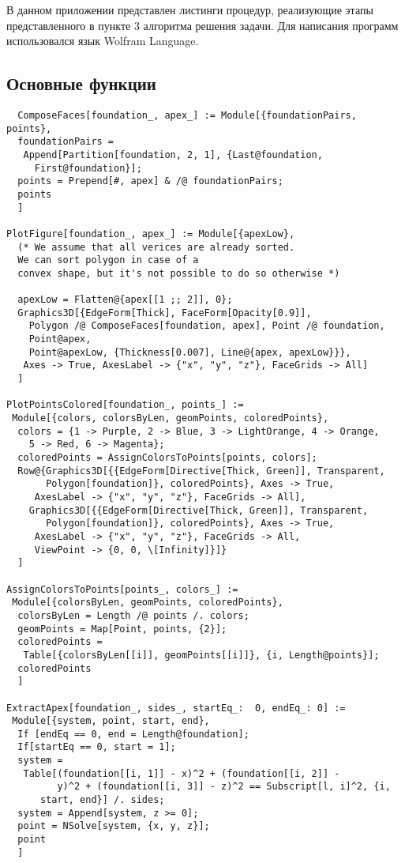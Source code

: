 \documentclass[../main.tex]{subfiles}
\begin{document}
В данном приложении представлен листинги процедур, реализующие этапы представленного в пункте 3 алгоритма решения задачи. Для написания программ использовался язык {\ttfamily Wolfram Language}.

\subsection{Основные функции}
\begin{lstlisting}
  ComposeFaces[foundation_, apex_] := Module[{foundationPairs, points},
  foundationPairs =
   Append[Partition[foundation, 2, 1], {Last@foundation,
     First@foundation}];
  points = Prepend[#, apex] & /@ foundationPairs;
  points
  ]

PlotFigure[foundation_, apex_] := Module[{apexLow},
  (* We assume that all verices are already sorted.
  We can sort polygon in case of a
  convex shape, but it's not possible to do so otherwise *)

  apexLow = Flatten@{apex[[1 ;; 2]], 0};
  Graphics3D[{EdgeForm[Thick], FaceForm[Opacity[0.9]],
    Polygon /@ ComposeFaces[foundation, apex], Point /@ foundation,
    Point@apex,
    Point@apexLow, {Thickness[0.007], Line@{apex, apexLow}}},
   Axes -> True, AxesLabel -> {"x", "y", "z"}, FaceGrids -> All]
  ]

PlotPointsColored[foundation_, points_] :=
 Module[{colors, colorsByLen, geomPoints, coloredPoints},
  colors = {1 -> Purple, 2 -> Blue, 3 -> LightOrange, 4 -> Orange,
    5 -> Red, 6 -> Magenta};
  coloredPoints = AssignColorsToPoints[points, colors];
  Row@{Graphics3D[{{EdgeForm[Directive[Thick, Green]], Transparent,
       Polygon[foundation]}, coloredPoints}, Axes -> True,
     AxesLabel -> {"x", "y", "z"}, FaceGrids -> All],
    Graphics3D[{{EdgeForm[Directive[Thick, Green]], Transparent,
       Polygon[foundation]}, coloredPoints}, Axes -> True,
     AxesLabel -> {"x", "y", "z"}, FaceGrids -> All,
     ViewPoint -> {0, 0, \[Infinity]}]}
  ]

AssignColorsToPoints[points_, colors_] :=
 Module[{colorsByLen, geomPoints, coloredPoints},
  colorsByLen = Length /@ points /. colors;
  geomPoints = Map[Point, points, {2}];
  coloredPoints =
   Table[{colorsByLen[[i]], geomPoints[[i]]}, {i, Length@points}];
  coloredPoints
  ]

ExtractApex[foundation_, sides_, startEq_:  0, endEq_: 0] :=
 Module[{system, point, start, end},
  If [endEq == 0, end = Length@foundation];
  If[startEq == 0, start = 1];
  system =
   Table[(foundation[[i, 1]] - x)^2 + (foundation[[i, 2]] -
         y)^2 + (foundation[[i, 3]] - z)^2 == Subscript[l, i]^2, {i,
      start, end}] /. sides;
  system = Append[system, z >= 0];
  point = NSolve[system, {x, y, z}];
  point
  ]


\end{lstlisting}
\end{document}

